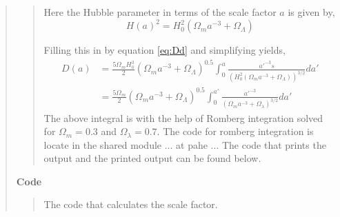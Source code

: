 \begin{quote}
\begin{quote}
Here the Hubble parameter in terms of the scale factor $a$ is given by,
\begin{equation}
H(a)^2 = H_0^2 ( \Omega_m a^{-3} + \Omega_{\Lambda} )
\end{equation}

Filling this in by equation \ref{eq:Dd} and simplifying yields,
\begin{align}
D(a) &= \frac{5 \Omega_m H_0^3}{2} ( \Omega_m a^{-3} + \Omega_{\Lambda} )^{0.5} \int_0^{a} \frac{a'^{-3}s}{\left(H_0^2( \Omega_m a^{-3} + \Omega_{\Lambda} ) \right)^{3/2}} da' \\
&= \frac{5 \Omega_m}{2}  ( \Omega_m a^{-3} + \Omega_{\Lambda} )^{0.5} \int_0^{a'} \frac{a'^{-3}}{\left(\Omega_m a^{-3} + \Omega_{\lambda}\right)^{3/2}} da'
\label{EQ:Stuffffff}
\end{align}
The above integral is with the help of Romberg integration solved for $\Omega_{m} =0.3$ and $\Omega_{\lambda} = 0.7$.  The code for romberg integration is locate in the shared module ... at pahe ... The code that prints the output and the printed output can be found below.
\end{quote}

\textbf{Code}
\begin{quote}
The code that calculates the scale factor. 


\end{quote}
\end{quote}





